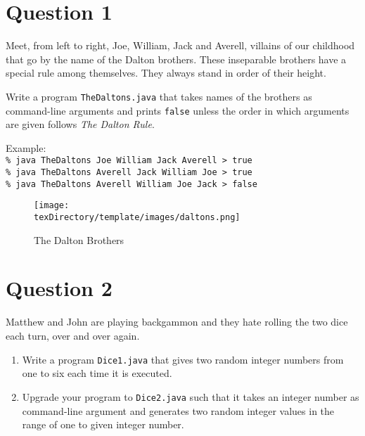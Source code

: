 \documentclass[12pt,letterpaper,twoside]{article}
\begin{document}


\section*{Question 1}

Meet, from left to right, Joe, William, Jack and Averell, villains of our childhood that go by the name of the Dalton brothers. These inseparable brothers have a special rule among themselves. They always stand in order of their height.

Write a program \texttt{TheDaltons.java} that takes names of the brothers as command-line arguments and prints \texttt{false} unless the order in which arguments are given follows \textit{The Dalton Rule}.

Example:\\
\texttt{\% java TheDaltons Joe William Jack Averell > true}\\
\texttt{\% java TheDaltons Averell Jack William Joe > true}\\
\texttt{\% java TheDaltons Averell William Joe Jack > false}

\begin{figure}[H]\centering
\texttt{[image: \\texDirectory/template/images/daltons.png]}
\caption{The Dalton Brothers}
\end{figure}

\section*{Question 2}

Matthew and John are playing backgammon and they hate rolling the two dice each turn, over and over again.

\begin{enumerate}
\item Write a program \texttt{Dice1.java} that gives two random integer numbers from one to six each time it is executed.
\item Upgrade your program to \texttt{Dice2.java} such that it takes an integer number as command-line argument and generates two random integer values in the range of one to given integer number.
\end{enumerate}

\end{document}
